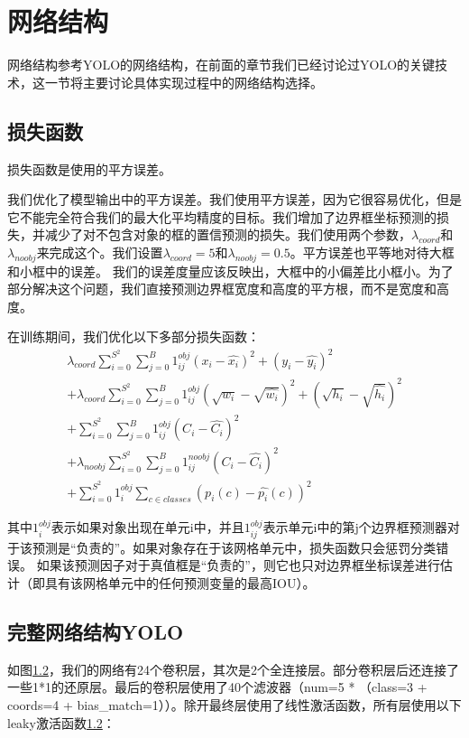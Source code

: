 \section{网络结构}{
网络结构参考YOLO的网络结构，在前面的章节我们已经讨论过YOLO的关键技术，这一节将主要讨论具体实现过程中的网络结构选择。

\subsection{损失函数}{
	损失函数是使用的平方误差。

	我们优化了模型输出中的平方误差。我们使用平方误差，因为它很容易优化，但是它不能完全符合我们的最大化平均精度的目标。我们增加了边界框坐标预测的损失，并减少了对不包含对象的框的置信预测的损失。我们使用两个参数，$\lambda_{coord}$和$\lambda_{noobj}$来完成这个。我们设置$\lambda_{coord}=5$和$\lambda_{noobj}=0.5$。平方误差也平等地对待大框和小框中的误差。 我们的误差度量应该反映出，大框中的小偏差比小框小。为了部分解决这个问题，我们直接预测边界框宽度和高度的平方根，而不是宽度和高度。

	在训练期间，我们优化以下多部分损失函数：
	\begin{eqnarray*}
	\lambda_{coord} \sum_{i=0}^{S^2} \sum_{j=0}^B 1_{ij}^{obj} (x_i - \hat{x_i})^2 + (y_i - \hat{y_i})^2 \\
	+ \lambda_{coord} \sum_{i=0}^{S^2} \sum_{j=0}^B 1_{ij}^{obj} (\sqrt{w_i} - \sqrt{\hat{w_i}})^2 + (\sqrt{h_i} - \sqrt{\hat{h_i}})^2 \\
	+ \sum_{i=0}^{S^2} \sum_{j=0}^B 1_{ij}^{obj} (C_i - \hat{C_i})^2 \\
	+ \lambda_{noobj} \sum_{i=0}^{S^2} \sum_{j=0}^B 1_{ij}^{noobj} (C_i - \hat{C_i})^2 \\
	+ \sum_{i=0}^{S^2} 1_{i}^{obj} \sum_{c \in classes} (p_i(c) - \hat{p_i}(c))^2
	\end{eqnarray*}

	其中$1_i^{obj}$表示如果对象出现在单元i中，并且$1_{ij}^{obj}$表示单元i中的第j个边界框预测器对于该预测是“负责的”。如果对象存在于该网格单元中，损失函数只会惩罚分类错误。 如果该预测因子对于真值框是“负责的”，则它也只对边界框坐标误差进行估计（即具有该网格单元中的任何预测变量的最高IOU）。
}

\subsection{完整网络结构YOLO}{
	如图\ref{}，我们的网络有24个卷积层，其次是2个全连接层。部分卷积层后还连接了一些1*1的还原层。最后的卷积层使用了40个滤波器（num=5 * （class=3 + coords=4 + bias_match=1））。除开最终层使用了线性激活函数，所有层使用以下leaky激活函数\ref{}：

}}
